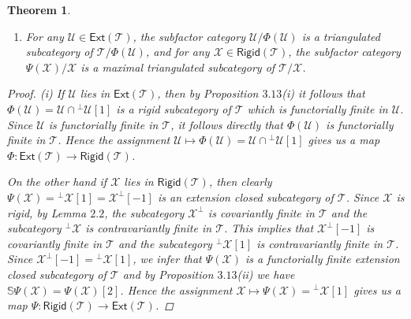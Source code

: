 \documentclass[oneside, a4paper,reqno]{amsart}
\numberwithin{equation}{section}
\newtheorem{thm}{Theorem}[section]
\theoremstyle{definition}
\begin{document}
\begin{thm}
\begin{enumerate}
\item For any ${\mathcal U} \in  \mathsf{Ext}({\mathcal T})$, the subfactor category ${\mathcal U}/\Phi({\mathcal U})$ is a triangulated subcategory of ${\mathcal T}/\Phi({\mathcal U})$, and for any ${\mathcal X} \in \mathsf{Rigid}({\mathcal T})$, the subfactor category $\Psi({\mathcal X})/{\mathcal X}$ is a maximal triangulated subcategory of ${\mathcal T}/{\mathcal X}$. 
\end{enumerate}  
\begin{proof} (i) If ${\mathcal U}$ lies in $\mathsf{Ext}({\mathcal T})$, then by Proposition $3.13$(i) it follows that $\Phi({\mathcal U}) = {\mathcal U} \cap {^{\bot}}{\mathcal U}[1]$ is a rigid subcategory of ${\mathcal T}$ which is functorially finite in ${\mathcal U}$. Since ${\mathcal U}$ is functorially finite in ${\mathcal T}$, it follows directly that $\Phi({\mathcal U})$ is functorially finite in ${\mathcal T}$.  
Hence the assignment ${\mathcal U} \longmapsto \Phi({\mathcal U}) = {\mathcal U} \cap {^{\bot}}{\mathcal U}[1]$ gives us a map $\Phi \colon \mathsf{Ext}({\mathcal T}) {\longrightarrow} \mathsf{Rigid}({\mathcal T})$.  

On the other hand if ${\mathcal X}$ lies in $\mathsf{Rigid}({\mathcal T})$, then clearly $\Psi({\mathcal X}) = {^{\bot}}{\mathcal X}[1] = {\mathcal X}^{\bot}[-1]$ is an extension closed subcategory of ${\mathcal T}$. Since ${\mathcal X}$ is rigid, by Lemma $2.2$, the subcategory ${\mathcal X}^{\bot}$ is covariantly finite in ${\mathcal T}$ and the subcategory ${^{\bot}}{\mathcal X}$ is contravariantly finite in ${\mathcal T}$.  This implies that   ${\mathcal X}^{\bot}[-1]$ is covariantly finite in ${\mathcal T}$ and the subcategory ${^{\bot}}{\mathcal X}[1]$ is contravariantly finite in ${\mathcal T}$. Since ${\mathcal X}^{\bot}[-1] = {^{\bot}}{\mathcal X}[1]$, we infer that $\Psi({\mathcal X})$ is a functorially finite  extension closed subcategory of ${\mathcal T}$ and by Proposition $3.13$(ii) we have $\mathbb S\Psi({\mathcal X}) = \Psi({\mathcal X})[2]$.  
Hence the assignment ${\mathcal X} \longmapsto \Psi({\mathcal X}) = {^{\bot}}{\mathcal X}[1]$ gives us a map $\Psi \colon \mathsf{Rigid}({\mathcal T}) {\longrightarrow} \mathsf{Ext}({\mathcal T})$. 


\end{proof}
\end{thm}
\end{document}
